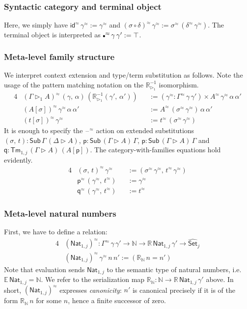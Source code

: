 \documentclass[acmsmall]{acmart}
\newcommand{\msf}[1]{\mathsf{#1}}
\newcommand{\mbb}[1]{\mathbb{#1}}
\newcommand{\wh}[1]{\widehat{#1}}
\newcommand{\ext}{\triangleright}
\newcommand{\Sub}{\msf{Sub}}
\newcommand{\Tm}{\msf{Tm}}
\newcommand{\p}{\mathsf{p}}
\newcommand{\q}{\mathsf{q}}
\newcommand{\Nat}{\msf{Nat}}
\newcommand{\emptycon}{\scaleobj{.75}\bullet}
\newcommand{\id}{\msf{id}}
\newcommand{\Set}{\mathsf{Set}}
\newcommand{\blank}{{\mathord{\hspace{1pt}\text{--}\hspace{1pt}}}}
\newcommand{\ev}{\mbb{E}}
\newcommand{\re}{\mbb{R}}
\theoremstyle{remark}
\newcommand{\whset}{\wh{\Set}}
\newcommand{\rexti}{\re_{\ext_1}^{-1}}
\newcommand{\rel}{^{\approx}}
\begin{document}
\subsubsection{Syntactic category and terminal object}
Here, we simply have $\id\rel\,\gamma\rel := \gamma\rel$ and $(\sigma \circ
\delta)\rel\,\gamma\rel := \sigma\rel\,(\delta\rel\,\gamma\rel)$. The terminal
object is interpreted as $\emptycon\rel\,\gamma\,\gamma' := \top$.

\subsubsection{Meta-level family structure}
We interpret context extension and type/term substitution as follows. Note the
usage of the pattern matching notation on the $\rexti$ isomorphism.
\begin{alignat*}{4}
  & (\Gamma \ext_1 A)\rel\,(\gamma,\,\alpha)\,(\rexti(\gamma',\,\alpha')) && :=
    (\gamma\rel : \Gamma\rel\,\gamma\,\gamma') \times A\rel\,\gamma\rel\,\alpha\,\alpha'\\
  & (A[\sigma])\rel\,\gamma\rel\,\alpha\,\alpha' && := A\rel\,(\sigma\rel\,\gamma\rel)\,\alpha\,\alpha'\\
  & (t[\sigma])\rel\,\gamma\rel\                 && := t\rel\,(\sigma\rel\,\gamma\rel)
\end{alignat*}
It is enough to specify the $\blank\rel$ action on extended substitutions
$(\sigma,\,t) : \Sub\,\Gamma\,(\Delta\ext A)$, $\p : \Sub\,(\Gamma\ext
A)\,\Gamma$, $\p : \Sub\,(\Gamma\ext A)\,\Gamma$ and $\q : \Tm_{1,j}\,(\Gamma
\ext A)\,(A[\p])$. The category-with-families equations hold evidently.
\begin{alignat*}{4}
  & (\sigma,\,t)\rel\,\gamma\rel                 && := (\sigma\rel\,\gamma\rel,\,t\rel\,\gamma\rel)\\
  & \p\rel\,(\gamma\rel,\,t\rel)                 && := \gamma\rel\\
  & \q\rel\,(\gamma\rel,\,t\rel)                 && := t\rel
\end{alignat*}

\subsubsection{Meta-level natural numbers} First, we have to define a relation:
\begin{alignat*}{4}
  & (\Nat_{1,j})\rel : \Gamma\rel\,\gamma\,\gamma' \to \mbb{N} \to \re\,\Nat_{1,j}\,\gamma' \to \whset_j\\
  & (\Nat_{1,j})\rel\,\gamma\rel\,n\,n' := (\re_{\mbb{N}}\,n = n')
\end{alignat*}
Note that evaluation sends $\Nat_{1,j}$ to the semantic type of natural numbers,
i.e.\ $\ev\,\Nat_{1,j} = \mbb{N}$. We refer to the serialization map
$\re_{\mbb{N}} : \mbb{N} \to \re\,\Nat_{1,j}\,\gamma'$ above. In short,
$(\Nat_{1,j})\rel$ expresses \emph{canonicity}: $n'$ is canonical precisely if
it is of the form $\re_{\mbb{N}}\,n$ for some $n$, hence a finite successor of
zero.
\end{document}
